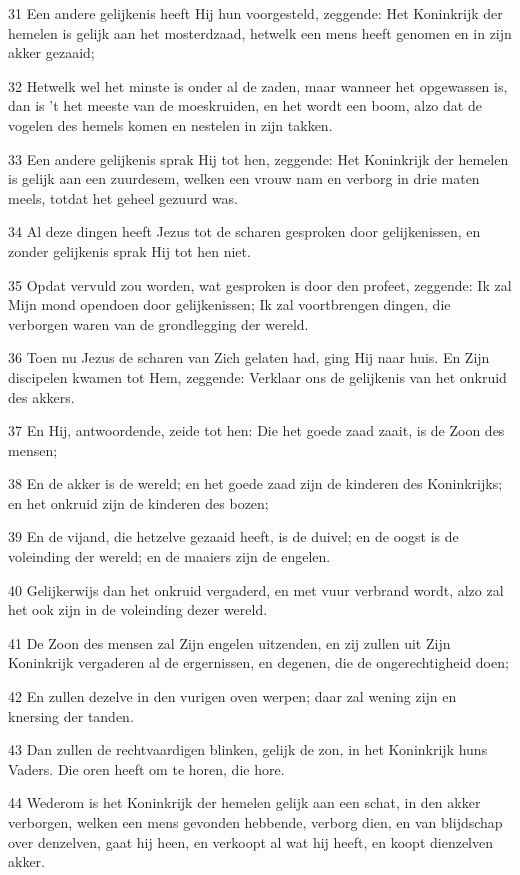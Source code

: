 \par 31 Een andere gelijkenis heeft Hij hun voorgesteld, zeggende: Het Koninkrijk der hemelen is gelijk aan het mosterdzaad, hetwelk een mens heeft genomen en in zijn akker gezaaid;
\par 32 Hetwelk wel het minste is onder al de zaden, maar wanneer het opgewassen is, dan is 't het meeste van de moeskruiden, en het wordt een boom, alzo dat de vogelen des hemels komen en nestelen in zijn takken.
\par 33 Een andere gelijkenis sprak Hij tot hen, zeggende: Het Koninkrijk der hemelen is gelijk aan een zuurdesem, welken een vrouw nam en verborg in drie maten meels, totdat het geheel gezuurd was.
\par 34 Al deze dingen heeft Jezus tot de scharen gesproken door gelijkenissen, en zonder gelijkenis sprak Hij tot hen niet.
\par 35 Opdat vervuld zou worden, wat gesproken is door den profeet, zeggende: Ik zal Mijn mond opendoen door gelijkenissen; Ik zal voortbrengen dingen, die verborgen waren van de grondlegging der wereld.
\par 36 Toen nu Jezus de scharen van Zich gelaten had, ging Hij naar huis. En Zijn discipelen kwamen tot Hem, zeggende: Verklaar ons de gelijkenis van het onkruid des akkers.
\par 37 En Hij, antwoordende, zeide tot hen: Die het goede zaad zaait, is de Zoon des mensen;
\par 38 En de akker is de wereld; en het goede zaad zijn de kinderen des Koninkrijks; en het onkruid zijn de kinderen des bozen;
\par 39 En de vijand, die hetzelve gezaaid heeft, is de duivel; en de oogst is de voleinding der wereld; en de maaiers zijn de engelen.
\par 40 Gelijkerwijs dan het onkruid vergaderd, en met vuur verbrand wordt, alzo zal het ook zijn in de voleinding dezer wereld.
\par 41 De Zoon des mensen zal Zijn engelen uitzenden, en zij zullen uit Zijn Koninkrijk vergaderen al de ergernissen, en degenen, die de ongerechtigheid doen;
\par 42 En zullen dezelve in den vurigen oven werpen; daar zal wening zijn en knersing der tanden.
\par 43 Dan zullen de rechtvaardigen blinken, gelijk de zon, in het Koninkrijk huns Vaders. Die oren heeft om te horen, die hore.
\par 44 Wederom is het Koninkrijk der hemelen gelijk aan een schat, in den akker verborgen, welken een mens gevonden hebbende, verborg dien, en van blijdschap over denzelven, gaat hij heen, en verkoopt al wat hij heeft, en koopt dienzelven akker.
